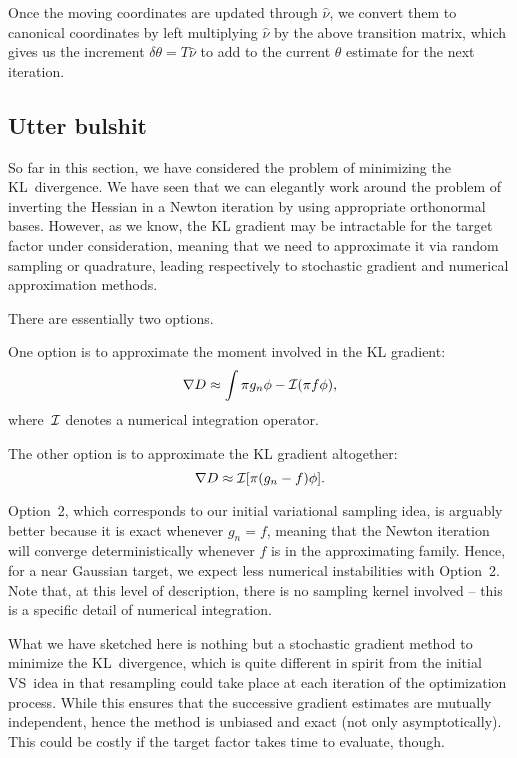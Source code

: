 \documentclass{article}
\begin{document}
Once the moving coordinates are updated through $\hat{\nu}$, we convert them to canonical coordinates by left multiplying $\hat{\nu}$ by the above transition matrix, which gives us the increment $\delta\theta=T\hat{\nu}$ to add to the current $\theta$ estimate for the next iteration.



\subsection{Utter bulshit}

So far in this section, we have considered the problem of minimizing the KL~divergence. We have seen that we can elegantly work around the problem of inverting the Hessian in a Newton iteration by using appropriate orthonormal bases. However, as we know, the KL gradient may be intractable for the target factor under consideration, meaning that we need to approximate it via random sampling or quadrature, leading respectively to stochastic gradient and numerical approximation methods.

There are essentially two options.

One option is to approximate the moment involved in the KL gradient:
$$
\nabla D \approx \int \pi g_n\phi - {\cal I}(\pi f \phi),
$$
where~${\cal I}$ denotes a numerical integration operator.

The other option is to approximate the KL gradient altogether:
$$
\nabla D \approx {\cal I}[\pi(g_n - f)\phi].
$$

Option~2, which corresponds to our initial variational sampling idea, is arguably better because it is exact whenever $g_n=f$, meaning that the Newton iteration will converge deterministically whenever $f$ is in the approximating family. Hence, for a near Gaussian target, we expect less numerical instabilities with Option~2. Note that, at this level of description, there is no sampling kernel involved -- this is a specific detail of numerical integration.

What we have sketched here is nothing but a stochastic gradient method to minimize the KL~divergence, which is quite different in spirit from the initial VS~idea in that resampling could take place at each iteration of the optimization process. While this ensures that the successive gradient estimates are mutually independent, hence the method is unbiased and exact (not only asymptotically). This could be costly if the target factor takes time to evaluate, though. 
\end{document}
